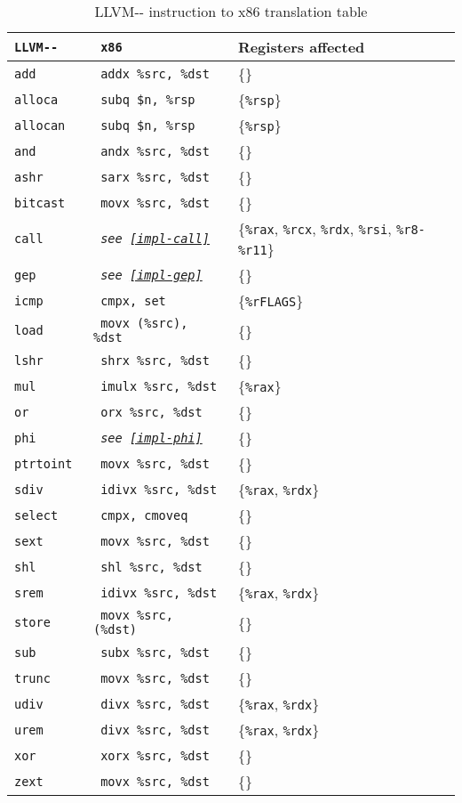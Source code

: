 \documentclass{article}
\begin{document}
\begin{table}[H]
  \centering
\begin{tabular}{|>{\tt}l|>{\tt}l|l|} 
 \hline
 LLVM-{}- & x86 & Registers affected\\
 \hline
add      & addx \%src, \%dst & \{\}\\
alloca   & subq \$n, \%rsp & \{\texttt{\%rsp}\}\\
allocan  & subq \$n, \%rsp & \{\texttt{\%rsp}\}\\
and      & andx \%src, \%dst & \{\}\\
ashr     & sarx \%src, \%dst & \{\}\\
bitcast  & movx \%src, \%dst & \{\}\\
call     & \textrm{\textit{see \ref{impl-call}}} & \{\texttt{\%rax}, \texttt{\%rcx}, \texttt{\%rdx}, \texttt{\%rsi}, \texttt{\%r8-\%r11}\}\\
gep      & \textrm{\textit{see \ref{impl-gep}}} & \{\}\\
icmp     & cmpx, set & \{\texttt{\%rFLAGS}\}\\
load     & movx (\%src), \%dst & \{\}\\
lshr     & shrx \%src, \%dst & \{\}\\
mul      & imulx \%src, \%dst & \{\texttt{\%rax}\}\\
or       & orx \%src, \%dst & \{\}\\
phi      & \textrm{\textit{see \ref{impl-phi}}} & \{\}\\
ptrtoint & movx \%src, \%dst & \{\}\\
sdiv     & idivx \%src, \%dst & \{\texttt{\%rax}, \texttt{\%rdx}\}\\
select   & cmpx, cmoveq & \{\}\\
sext     & movx \%src, \%dst & \{\}\\
shl      & shl \%src, \%dst & \{\}\\
srem     & idivx \%src, \%dst & \{\texttt{\%rax}, \texttt{\%rdx}\}\\
store    & movx \%src, (\%dst) & \{\}\\
sub      & subx \%src, \%dst & \{\}\\
trunc    & movx \%src, \%dst & \{\}\\
udiv     & divx \%src, \%dst & \{\texttt{\%rax}, \texttt{\%rdx}\}\\
urem     & divx \%src, \%dst & \{\texttt{\%rax}, \texttt{\%rdx}\}\\
xor      & xorx \%src, \%dst & \{\}\\
zext     & movx \%src, \%dst & \{\}\\
 \hline
\end{tabular}
\caption{LLVM-{}- instruction to x86 translation table}\label{tab:trans}
\end{table}
\end{document}
